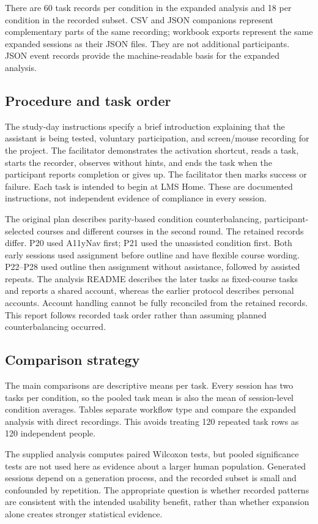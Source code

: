 \documentclass[11pt,a4paper]{article}
\begin{document}
There are 60 task records per condition in the expanded analysis and 18 per condition in the recorded subset. CSV and JSON companions represent complementary parts of the same recording; workbook exports represent the same expanded sessions as their JSON files. They are not additional participants. JSON event records provide the machine-readable basis for the expanded analysis.

\subsection{Procedure and task order}
The study-day instructions specify a brief introduction explaining that the assistant is being tested, voluntary participation, and screen/mouse recording for the project. The facilitator demonstrates the activation shortcut, reads a task, starts the recorder, observes without hints, and ends the task when the participant reports completion or gives up. The facilitator then marks success or failure. Each task is intended to begin at LMS Home. These are documented instructions, not independent evidence of compliance in every session.

The original plan describes parity-based condition counterbalancing, participant-selected courses and different courses in the second round. The retained records differ. P20 used A11yNav first; P21 used the unassisted condition first. Both early sessions used assignment before outline and have flexible course wording. P22--P28 used outline then assignment without assistance, followed by assisted repeats. The analysis README describes the later tasks as fixed-course tasks and reports a shared account, whereas the earlier protocol describes personal accounts. Account handling cannot be fully reconciled from the retained records. This report follows recorded task order rather than assuming planned counterbalancing occurred.

\subsection{Comparison strategy}
The main comparisons are descriptive means per task. Every session has two tasks per condition, so the pooled task mean is also the mean of session-level condition averages. Tables separate workflow type and compare the expanded analysis with direct recordings. This avoids treating 120 repeated task rows as 120 independent people.

The supplied analysis computes paired Wilcoxon tests, but pooled significance tests are not used here as evidence about a larger human population. Generated sessions depend on a generation process, and the recorded subset is small and confounded by repetition. The appropriate question is whether recorded patterns are consistent with the intended usability benefit, rather than whether expansion alone creates stronger statistical evidence.
\end{document}
